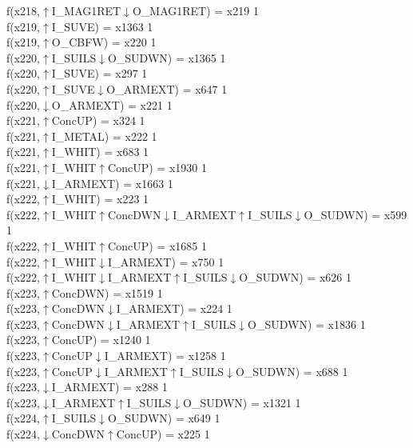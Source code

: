f(x218,$\uparrow$I\_MAG1RET$\downarrow$O\_MAG1RET) = x219 {1} \\
f(x219,$\uparrow$I\_SUVE) = x1363 {1} \\
f(x219,$\uparrow$O\_CBFW) = x220 {1} \\
f(x220,$\uparrow$I\_SUILS$\downarrow$O\_SUDWN) = x1365 {1} \\
f(x220,$\uparrow$I\_SUVE) = x297 {1} \\
f(x220,$\uparrow$I\_SUVE$\downarrow$O\_ARMEXT) = x647 {1} \\
f(x220,$\downarrow$O\_ARMEXT) = x221 {1} \\
f(x221,$\uparrow$ConcUP) = x324 {1} \\
f(x221,$\uparrow$I\_METAL) = x222 {1} \\
f(x221,$\uparrow$I\_WHIT) = x683 {1} \\
f(x221,$\uparrow$I\_WHIT$\uparrow$ConcUP) = x1930 {1} \\
f(x221,$\downarrow$I\_ARMEXT) = x1663 {1} \\
f(x222,$\uparrow$I\_WHIT) = x223 {1} \\
f(x222,$\uparrow$I\_WHIT$\uparrow$ConcDWN$\downarrow$I\_ARMEXT$\uparrow$I\_SUILS$\downarrow$O\_SUDWN) = x599 {1} \\
f(x222,$\uparrow$I\_WHIT$\uparrow$ConcUP) = x1685 {1} \\
f(x222,$\uparrow$I\_WHIT$\downarrow$I\_ARMEXT) = x750 {1} \\
f(x222,$\uparrow$I\_WHIT$\downarrow$I\_ARMEXT$\uparrow$I\_SUILS$\downarrow$O\_SUDWN) = x626 {1} \\
f(x223,$\uparrow$ConcDWN) = x1519 {1} \\
f(x223,$\uparrow$ConcDWN$\downarrow$I\_ARMEXT) = x224 {1} \\
f(x223,$\uparrow$ConcDWN$\downarrow$I\_ARMEXT$\uparrow$I\_SUILS$\downarrow$O\_SUDWN) = x1836 {1} \\
f(x223,$\uparrow$ConcUP) = x1240 {1} \\
f(x223,$\uparrow$ConcUP$\downarrow$I\_ARMEXT) = x1258 {1} \\
f(x223,$\uparrow$ConcUP$\downarrow$I\_ARMEXT$\uparrow$I\_SUILS$\downarrow$O\_SUDWN) = x688 {1} \\
f(x223,$\downarrow$I\_ARMEXT) = x288 {1} \\
f(x223,$\downarrow$I\_ARMEXT$\uparrow$I\_SUILS$\downarrow$O\_SUDWN) = x1321 {1} \\
f(x224,$\uparrow$I\_SUILS$\downarrow$O\_SUDWN) = x649 {1} \\
f(x224,$\downarrow$ConcDWN$\uparrow$ConcUP) = x225 {1} \\
